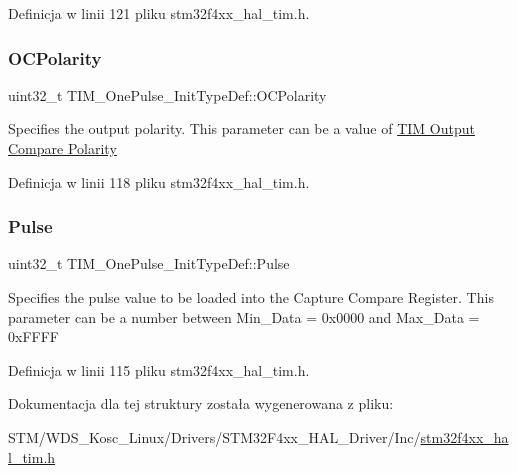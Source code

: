Definicja w linii 121 pliku stm32f4xx\+\_\+hal\+\_\+tim.\+h.

\mbox{\label{struct_t_i_m___one_pulse___init_type_def_a3028787ad41698072cbf70ddf1b6c984}} 
\subsubsection{\texorpdfstring{O\+C\+Polarity}{OCPolarity}}
{\footnotesize\ttfamily uint32\+\_\+t T\+I\+M\+\_\+\+One\+Pulse\+\_\+\+Init\+Type\+Def\+::\+O\+C\+Polarity}

Specifies the output polarity. This parameter can be a value of \hyperlink{group___t_i_m___output___compare___polarity}{T\+IM Output Compare Polarity} 

Definicja w linii 118 pliku stm32f4xx\+\_\+hal\+\_\+tim.\+h.

\mbox{\label{struct_t_i_m___one_pulse___init_type_def_a4f1fbf6d60812c3194e9ee8a05f5cfa6}} 
\subsubsection{\texorpdfstring{Pulse}{Pulse}}
{\footnotesize\ttfamily uint32\+\_\+t T\+I\+M\+\_\+\+One\+Pulse\+\_\+\+Init\+Type\+Def\+::\+Pulse}

Specifies the pulse value to be loaded into the Capture Compare Register. This parameter can be a number between Min\+\_\+\+Data = 0x0000 and Max\+\_\+\+Data = 0x\+F\+F\+FF 

Definicja w linii 115 pliku stm32f4xx\+\_\+hal\+\_\+tim.\+h.



Dokumentacja dla tej struktury została wygenerowana z pliku\+:\begin{DoxyCompactItemize}
\item 
S\+T\+M/\+W\+D\+S\+\_\+\+Kosc\+\_\+\+Linux/\+Drivers/\+S\+T\+M32\+F4xx\+\_\+\+H\+A\+L\+\_\+\+Driver/\+Inc/\hyperlink{stm32f4xx__hal__tim_8h}{stm32f4xx\+\_\+hal\+\_\+tim.\+h}\end{DoxyCompactItemize}
